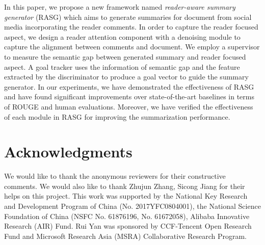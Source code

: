 \documentclass[letterpaper]{article}
\begin{document}
In this paper, we propose a new framework named \emph{reader-aware summary generator} (RASG) which aims to generate summaries for document from social media incorporating the reader comments.
In order to capture the reader focused aspect, we design a reader attention component with a denoising module to capture the alignment between comments and document.
We employ a supervisor to measure the semantic gap between generated summary and reader focused aspect.
A goal tracker uses the information of semantic gap and the feature extracted by the discriminator to produce a goal vector to guide the summary generator.
In our experiments, we have demonstrated the effectiveness of RASG and have found significant improvements over state-of-the-art baselines in terms of ROUGE and human evaluations.
Moreover, we have verified the effectiveness of each module in RASG for improving the summarization performance.

\section{Acknowledgments}
We would like to thank the anonymous reviewers for their constructive comments.
We would also like to thank Zhujun Zhang, Sicong Jiang for their helps on this project.
This work was supported by the National Key Research and Development Program of China (No. 2017YFC0804001), the National Science Foundation of China (NSFC No. 61876196, No. 61672058), Alibaba Innovative Research (AIR) Fund.
Rui Yan was sponsored by CCF-Tencent Open Research Fund and Microsoft Research Asia (MSRA) Collaborative Research Program.

\clearpage


\end{document}
